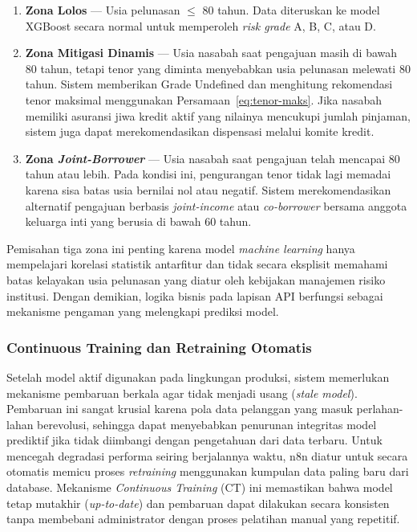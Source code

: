 \begin{enumerate}
    \item \textbf{Zona Lolos} --- Usia pelunasan $\leq$ 80 tahun. Data diteruskan ke model XGBoost secara normal untuk memperoleh \textit{risk grade} A, B, C, atau D.
    \item \textbf{Zona Mitigasi Dinamis} --- Usia nasabah saat pengajuan masih di bawah 80 tahun, tetapi tenor yang diminta menyebabkan usia pelunasan melewati 80 tahun. Sistem memberikan Grade Undefined dan menghitung rekomendasi tenor maksimal menggunakan Persamaan~\ref{eq:tenor-maks}. Jika nasabah memiliki asuransi jiwa kredit aktif yang nilainya mencukupi jumlah pinjaman, sistem juga dapat merekomendasikan dispensasi melalui komite kredit.
    \item \textbf{Zona \textit{Joint-Borrower}} --- Usia nasabah saat pengajuan telah mencapai 80 tahun atau lebih. Pada kondisi ini, pengurangan tenor tidak lagi memadai karena sisa batas usia bernilai nol atau negatif. Sistem merekomendasikan alternatif pengajuan berbasis \textit{joint-income} atau \textit{co-borrower} bersama anggota keluarga inti yang berusia di bawah 60 tahun.
\end{enumerate}

Pemisahan tiga zona ini penting karena model \textit{machine learning} hanya mempelajari korelasi statistik antarfitur dan tidak secara eksplisit memahami batas kelayakan usia pelunasan yang diatur oleh kebijakan manajemen risiko institusi. Dengan demikian, logika bisnis pada lapisan API berfungsi sebagai mekanisme pengaman yang melengkapi prediksi model.

\subsubsection{Continuous Training dan Retraining Otomatis}
Setelah model aktif digunakan pada lingkungan produksi, sistem memerlukan mekanisme pembaruan berkala agar tidak menjadi usang (\textit{stale model}). Pembaruan ini sangat krusial karena pola data pelanggan yang masuk perlahan-lahan berevolusi, sehingga dapat menyebabkan penurunan integritas model prediktif jika tidak diimbangi dengan pengetahuan dari data terbaru. Untuk mencegah degradasi performa seiring berjalannya waktu, n8n diatur untuk secara otomatis memicu proses \textit{retraining} menggunakan kumpulan data paling baru dari database. Mekanisme \textit{Continuous Training} (CT) ini memastikan bahwa model tetap mutakhir (\textit{up-to-date}) dan pembaruan dapat dilakukan secara konsisten tanpa membebani administrator dengan proses pelatihan manual yang repetitif.

